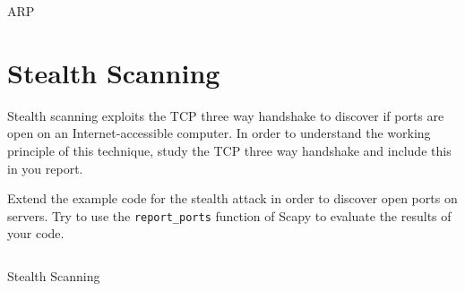 \documentclass[11pt,a4paper]{article}
\begin{document}
\begin{listing}[h]
    \inputminted{python}{../code_students/example-arp.py}
\caption{ARP}\label{listing:arp-request}
\end{listing}

\FloatBarrier
\section{Stealth Scanning}
Stealth scanning exploits the TCP three way handshake to discover if ports are open on an Internet-accessible computer. In order to understand the working principle of this technique, study the TCP three way handshake and include this in you report.

\begin{question}
Extend the example code for the stealth attack in order to discover open ports on servers.
Try to use the \texttt{report\_ports} function of Scapy to evaluate the results of your code.
\end{question}


\begin{listing}[h]
\inputminted{python}{../code_students/stealth_scanning.py}
\caption{Stealth Scanning}%
\label{listing:stealth-scanning}
\end{listing}


\FloatBarrier
\end{document}
